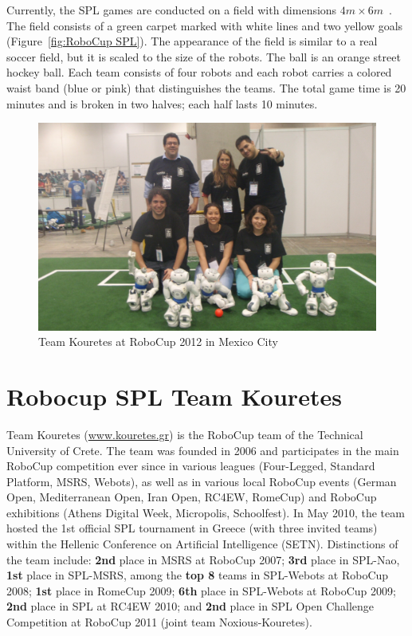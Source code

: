 Currently, the SPL games are conducted on a field with dimensions $4m \times 6m$~\cite{SPLrules2012}. The field consists of a green carpet marked with white lines and two yellow goals (Figure~\ref{fig:RoboCup SPL}). The appearance of the field is similar to a real soccer field, but it is scaled to the size of the robots. The ball is an orange street hockey ball. Each team consists of four robots and each robot carries a colored waist band (blue or pink) that distinguishes the teams. The total game time is 20 minutes and is broken in two halves; each half lasts 10 minutes.




\begin{figure}[t!]
	\begin{center}
		\includegraphics[width=.9\textwidth]{Figures/robocup2012-team.jpg}
 		\caption{Team Kouretes at RoboCup 2012 in Mexico City}
 		\label{fig:Kouretes2012}
	\end{center}
\end{figure}

\section{Robocup SPL Team Kouretes}

Team Kouretes (\url{www.kouretes.gr}) is the RoboCup team of the Technical University of Crete. The team was founded in 2006 and participates in the main RoboCup competition ever since in various leagues (Four-Legged, Standard Platform, MSRS, Webots), as well as in various local RoboCup events (German Open, Mediterranean Open, Iran Open, RC4EW, RomeCup) and RoboCup exhibitions (Athens Digital Week, Micropolis, Schoolfest). In May 2010, the team hosted the 1st official SPL tournament in Greece (with three invited teams) within the Hellenic Conference on Artificial Intelligence (SETN). Distinctions of the team include: {\bf 2nd} place in MSRS at RoboCup 2007; {\bf 3rd} place in SPL-Nao, {\bf 1st} place in SPL-MSRS, among the {\bf top 8} teams in SPL-Webots at RoboCup 2008; {\bf 1st} place in RomeCup 2009; {\bf 6th} place in SPL-Webots at RoboCup 2009; {\bf 2nd} place in SPL at RC4EW 2010; and {\bf 2nd} place in SPL Open Challenge Competition at RoboCup 2011 (joint team Noxious-Kouretes).

